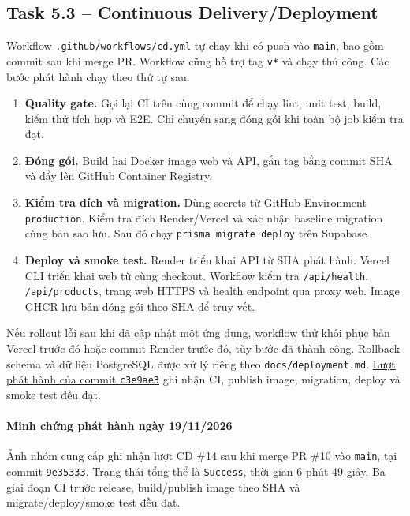 \subsection{Task 5.3 -- Continuous Delivery/Deployment}

Workflow \nolinkurl{.github/workflows/cd.yml} tự chạy khi có push vào
\texttt{main}, bao gồm commit sau khi merge PR. Workflow cũng hỗ trợ tag
\nolinkurl{v*} và chạy thủ công. Các bước phát hành chạy theo thứ tự sau.

\begin{enumerate}[leftmargin=*]
  \item \textbf{Quality gate.} Gọi lại CI trên cùng commit để chạy lint,
        unit test, build, kiểm thử tích hợp và E2E. Chỉ chuyển sang đóng gói
        khi toàn bộ job kiểm tra đạt.
  \item \textbf{Đóng gói.} Build hai Docker image web và API, gắn tag bằng
        commit SHA và đẩy lên GitHub Container Registry.
  \item \textbf{Kiểm tra đích và migration.} Dùng secrets từ GitHub
        Environment \texttt{production}. Kiểm tra đích Render/Vercel và xác
        nhận baseline migration cùng bản sao lưu. Sau đó chạy
        \texttt{prisma migrate deploy} trên Supabase.
  \item \textbf{Deploy và smoke test.} Render triển khai API từ SHA phát hành.
        Vercel CLI triển khai web từ cùng checkout. Workflow kiểm tra
        \nolinkurl{/api/health}, \nolinkurl{/api/products}, trang web HTTPS và
        health endpoint qua proxy web. Image GHCR lưu bản đóng gói theo SHA
        để truy vết.
\end{enumerate}

Nếu rollout lỗi sau khi đã cập nhật một ứng dụng, workflow thử khôi phục bản
Vercel trước đó hoặc commit Render trước đó, tùy bước đã thành công. Rollback
schema và dữ liệu PostgreSQL được xử lý riêng theo
\nolinkurl{docs/deployment.md}.
\href{https://github.com/PhucTruong11/brewlite-assignment2/actions/runs/43554939814}{Lượt phát hành của commit \texttt{c3e9ae3}}
ghi nhận CI, publish image, migration, deploy và smoke test đều đạt.

\paragraph{Minh chứng phát hành ngày 19/11/2026}
Ảnh nhóm cung cấp ghi nhận lượt CD \#14 sau khi merge PR \#10 vào
\texttt{main}, tại commit \texttt{9e35333}. Trạng thái tổng thể là
\texttt{Success}, thời gian 6 phút 49 giây. Ba giai đoạn CI trước release,
build/publish image theo SHA và migrate/deploy/smoke test đều đạt.

